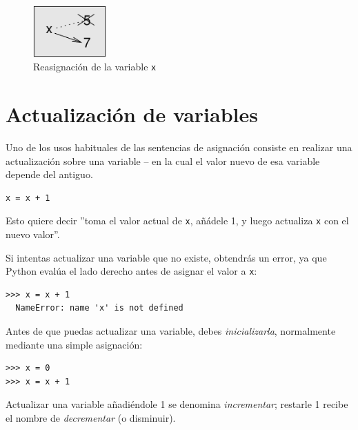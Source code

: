 \begin{figure}[t]
\begin{center}
\includegraphics[width=0.25\textwidth]{images/assign2.pdf}
\end{center}
\caption{Reasignación de la variable \texttt{x}}
\label{fig.assign2}
\end{figure}



\hypertarget{update}{%
\section{Actualización de variables}\label{update}}

 

Uno de los usos habituales de las sentencias de asignación consiste en
realizar una actualización sobre una variable -- en la cual el valor
nuevo de esa variable depende del antiguo.

\begin{Verbatim}[frame=single]
x = x + 1
\end{Verbatim}

Esto quiere decir ''toma el valor actual de \texttt{x}, añádele 1, y luego actualiza \texttt{x} con el nuevo valor''.

Si intentas actualizar una variable que no existe, obtendrás un error,
ya que Python evalúa el lado derecho antes de asignar el valor a
\texttt{x}:

\begin{Verbatim}[frame=single]
>>> x = x + 1
  NameError: name 'x' is not defined
\end{Verbatim}

Antes de que puedas actualizar una variable, debes \emph{inicializarla},
normalmente mediante una simple asignación:


\begin{Verbatim}[frame=single]
>>> x = 0
>>> x = x + 1
\end{Verbatim}

Actualizar una variable añadiéndole 1 se denomina \emph{incrementar};
restarle 1 recibe el nombre de \emph{decrementar} (o disminuir).

